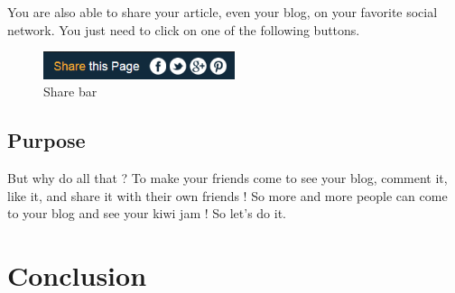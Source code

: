 \documentclass[a4paper,10pt]{article}
\begin{document}
You are also able to share your article, even your blog, on your favorite social network. You just need to click on one of the following buttons.

\begin{figure}[h]
    \center
  \includegraphics[width=0.5\textwidth]{Images/blogBar.png}
    \caption{Share bar}
\end{figure}

\subsection{Purpose}

But why do all that ? To make your friends come to see your blog, comment it, like it, and share it with their own friends ! So more and more people can come to your blog and see your kiwi jam ! So let's do it.

 


\newpage
\section{Conclusion}
\end{document}
